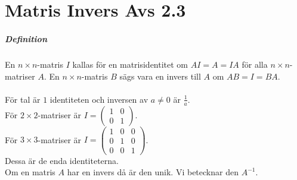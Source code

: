 \chapter{Matris Invers Avs 2.3}
\paragraph{Definition} En $n\times n$-matris $I$ kallas för en matrisidentitet om $AI=A=IA$ för alla $n\times n$-matriser $A$.
En $n\times n$-matris $B$ sägs vara en invers till $A$ om $AB=I=BA$.
\\\\
För tal är $1$ identiteten och inversen av $a\neq 0$ är $\frac{1}{a}$.\\
För $2\times 2$-matriser är $I=\begin{pmatrix}1&0\\0&1\end{pmatrix}$.\\
För $3\times 3$-matriser är $I=\begin{pmatrix}1&0&0\\0&1&0\\0&0&1\end{pmatrix}$.\\
Dessa är de enda identiteterna.\\
Om en matris $A$ har en invers då är den unik.
Vi betecknar den $A^{-1}$.

